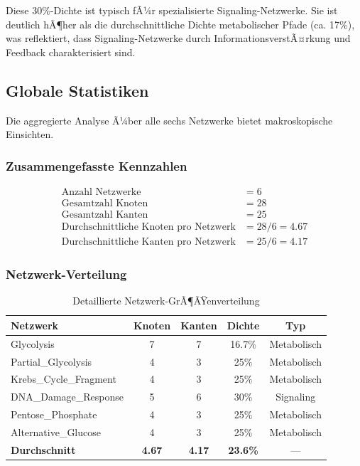 ﻿\documentclass[a4paper,12pt]{article}
\theoremstyle{definition}
\begin{document}
Diese 30\%-Dichte ist typisch fÃ¼r spezialisierte Signaling-Netzwerke. Sie ist deutlich hÃ¶her als die durchschnittliche Dichte metabolischer Pfade (ca. 17\%), was reflektiert, dass Signaling-Netzwerke durch InformationsverstÃ¤rkung und Feedback charakterisiert sind.

\subsection{Globale Statistiken}

Die aggregierte Analyse Ã¼ber alle sechs Netzwerke bietet makroskopische Einsichten.

\subsubsection{Zusammengefasste Kennzahlen}

\begin{align*}
	\text{Anzahl Netzwerke} &= 6 \\
	\text{Gesamtzahl Knoten} &= 28 \\
	\text{Gesamtzahl Kanten} &= 25 \\
	\text{Durchschnittliche Knoten pro Netzwerk} &= 28 / 6 = 4.67 \\
	\text{Durchschnittliche Kanten pro Netzwerk} &= 25 / 6 = 4.17
\end{align*}

\subsubsection{Netzwerk-Verteilung}

\begin{table}[h]
	\centering
	\caption{Detaillierte Netzwerk-GrÃ¶ÃŸenverteilung}
	\label{tab:network_distribution}
	\begin{tabular}{|l|c|c|c|c|}
		\hline
		\textbf{Netzwerk} & \textbf{Knoten} & \textbf{Kanten} & \textbf{Dichte} & \textbf{Typ} \\
		\hline
		Glycolysis & 7 & 7 & 16.7\% & Metabolisch \\
		Partial\_Glycolysis & 4 & 3 & 25\% & Metabolisch \\
		Krebs\_Cycle\_Fragment & 4 & 3 & 25\% & Metabolisch \\
		DNA\_Damage\_Response & 5 & 6 & 30\% & Signaling \\
		Pentose\_Phosphate & 4 & 3 & 25\% & Metabolisch \\
		Alternative\_Glucose & 4 & 3 & 25\% & Metabolisch \\
		\hline
		\textbf{Durchschnitt} & \textbf{4.67} & \textbf{4.17} & \textbf{23.6\%} & --- \\
		\hline
	\end{tabular}
\end{table}
\end{document}
